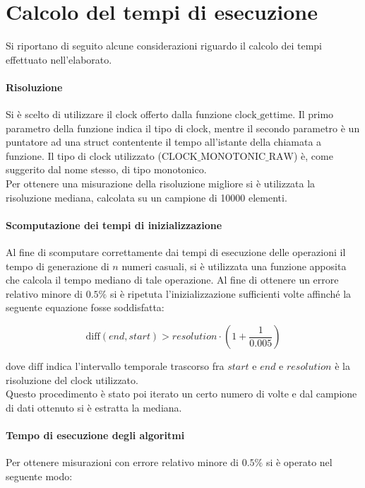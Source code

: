 \documentclass{article}
\begin{document}
	\newpage
	\section{Calcolo del tempi di esecuzione}	
	\label{section:exec}
	Si riportano di seguito alcune	considerazioni riguardo il calcolo dei tempi effettuato nell'elaborato.
	
	\paragraph{Risoluzione}
	Si è scelto di utilizzare il clock offerto dalla funzione $\text{clock\_gettime}$. Il primo parametro della funzione indica il tipo di clock, mentre il secondo parametro è un puntatore ad una struct contentente il tempo all'istante della chiamata a funzione. Il tipo di clock utilizzato ($\text{CLOCK\_MONOTONIC\_RAW}$) è, come suggerito dal nome stesso, di tipo monotonico. \\ Per ottenere una misurazione della risoluzione migliore si è utilizzata la risoluzione mediana, calcolata su un campione di 10000 elementi.
	
	\paragraph{Scomputazione dei tempi di inizializzazione}
	Al fine di scomputare correttamente dai tempi di esecuzione delle operazioni il tempo di generazione di $n$ numeri casuali, si è utilizzata una funzione apposita che calcola il tempo mediano di tale operazione. Al fine di ottenere un errore relativo minore di $0.5\%$ si è ripetuta l'inizializzazione sufficienti volte affinché la seguente equazione fosse soddisfatta:
	
	\[
		\text{diff}\left(end, start\right) > resolution \cdot \left(1+\frac{1}{0.005}\right)  
	\]
	
	dove $\text{diff}$ indica l'intervallo temporale trascorso fra $start$ e $end$ e $resolution$ è la risoluzione del clock utilizzato. \\ Questo procedimento è stato poi iterato un certo numero di volte e dal campione di dati ottenuto si è estratta la mediana.
	
	\paragraph{Tempo di esecuzione degli algoritmi}
	Per ottenere misurazioni con errore relativo minore di $0.5\%$ si è operato nel seguente modo:
	
\end{document}
